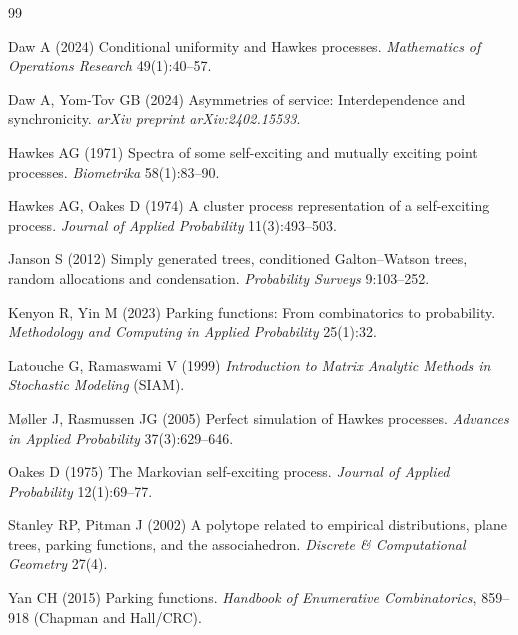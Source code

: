 \documentclass[stsy,dblanonrev]{amers/INFORMS-STSY-Template-26-02-2026/informs4}
\begin{document}
\FloatBarrier
\begingroup
\begin{thebibliography}{99}
\raggedright

 Daw A (2024) Conditional uniformity and Hawkes processes. \emph{Mathematics of Operations Research} 49(1):40--57.

 Daw A, Yom-Tov GB (2024) Asymmetries of service: Interdependence and synchronicity. \emph{arXiv preprint arXiv:2402.15533}.

 Hawkes AG (1971) Spectra of some self-exciting and mutually exciting point processes. \emph{Biometrika} 58(1):83--90.

 Hawkes AG, Oakes D (1974) A cluster process representation of a self-exciting process. \emph{Journal of Applied Probability} 11(3):493--503.

 Janson S (2012) Simply generated trees, conditioned Galton--Watson trees, random allocations and condensation. \emph{Probability Surveys} 9:103--252.

 Kenyon R, Yin M (2023) Parking functions: From combinatorics to probability. \emph{Methodology and Computing in Applied Probability} 25(1):32.

 Latouche G, Ramaswami V (1999) \emph{Introduction to Matrix Analytic Methods in Stochastic Modeling} (SIAM).

 M{\o}ller J, Rasmussen JG (2005) Perfect simulation of Hawkes processes. \emph{Advances in Applied Probability} 37(3):629--646.

 Oakes D (1975) The Markovian self-exciting process. \emph{Journal of Applied Probability} 12(1):69--77.

 Stanley RP, Pitman J (2002) A polytope related to empirical distributions, plane trees, parking functions, and the associahedron. \emph{Discrete \& Computational Geometry} 27(4). %

 Yan CH (2015) Parking functions. \emph{Handbook of Enumerative Combinatorics}, 859--918 (Chapman and Hall/CRC).
\end{thebibliography}
\endgroup
\end{document}
